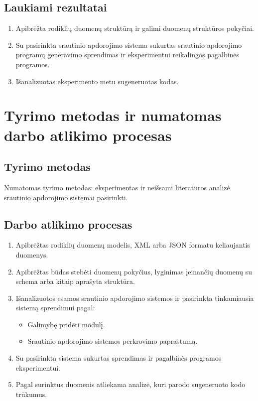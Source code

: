 \documentclass{VUMIFPSbakalaurinis}
\begin{document}
\subsection{Laukiami rezultatai}
\begin{enumerate}
    \item Apibrėžta rodiklių duomenų struktūrą ir galimi duomenų struktūros pokyčiai.
    \item Su pasirinkta srautinio apdorojimo sistema sukurtas srautinio apdorojimo programų generavimo sprendimas ir eksperimentui reikalingos pagalbinės programos. 
    \item Išanalizuotas eksperimento metu sugeneruotas kodas. 
\end{enumerate}
\section{Tyrimo metodas ir numatomas darbo atlikimo procesas}

\subsection{Tyrimo metodas}
Numatomas tyrimo metodas: eksperimentas ir neišsami literatūros analizė srautinio apdorojimo sistemai pasirinkti. \par 

\subsection{Darbo atlikimo procesas}
\begin{enumerate}
    \item Apibrėžtas rodiklių duomenų modelis, XML arba JSON formatu keliaujantis duomenys.
    \item Apibrėžtas būdas stebėti duomenų pokyčius, lyginimas įeinančių duomenų su schema arba kitaip aprašyta struktūra.
    \item Išanalizuotos esamos srautinio apdorojimo sistemos ir pasirinkta tinkamiausia sistemą sprendimui pagal:
    	\begin{itemize}
		\item Galimybę pridėti modulį.
		\item Srautinio apdorojimo sistemos perkrovimo paprastumą.
	\end{itemize}
    \item Su pasirinkta sistema sukurtas sprendimas ir pagalbinės programos eksperimentui.
    \item Pagal surinktus duomenis atliekama analizė, kuri parodo sugeneruoto kodo trūkumus. 
\end{enumerate}
\end{document}
